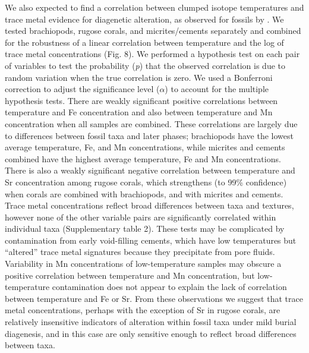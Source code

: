 \documentclass[preprint, authoryear]{elsarticle}
\begin{document}
We also expected to find a correlation between clumped isotope temperatures and trace metal evidence for diagenetic alteration, as observed for fossils by \cite{Finnegan2011}. We tested brachiopods, rugose corals, and micrites/cements separately and combined for the robustness of a linear correlation between temperature and the log of trace metal concentrations (Fig. 8). We performed a hypothesis test on each pair of variables to test the probability (\textit{p}) that the observed correlation is due to random variation when the true correlation is zero. We used a Bonferroni correction to adjust the significance level ($\alpha$) to account for the multiple hypothesis tests. There are weakly significant positive correlations between temperature and Fe concentration and also between temperature and Mn concentration when all samples are combined. These correlations are largely due to differences between fossil taxa and later phases; brachiopods have the lowest average temperature, Fe, and Mn concentrations, while micrites and cements combined have the highest average temperature, Fe and Mn concentrations. There is also a weakly significant negative correlation between temperature and Sr concentration among rugose corals, which strengthens (to 99\% confidence) when corals are combined with brachiopods, and with micrites and cements. Trace metal concentrations reflect broad differences between taxa and textures, however none of the other variable pairs are significantly correlated within individual taxa (Supplementary table 2). These tests may be complicated by contamination from early void-filling cements, which have low temperatures but ``altered'' trace metal signatures because they precipitate from pore fluids. Variability in Mn concentrations of low-temperature samples may obscure a positive correlation between temperature and Mn concentration, but low-temperature contamination does not appear to explain the lack of correlation between temperature and Fe or Sr. From these observations we suggest that trace metal concentrations, perhaps with the exception of Sr in rugose corals, are relatively insensitive indicators of alteration within fossil taxa under mild burial diagenesis, and in this case are only sensitive enough to reflect broad differences between taxa. 
\end{document}
